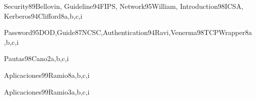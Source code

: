 \begin{syllabus}
\begin{unit}{\NCNetworkSecurityDef}{}{Security89Bellovin, Guideline94FIPS, Network95William, Introduction98ICSA, Kerberos94Clifford}{8}{a,b,c,i}
    \NCNetworkSecurityAllTopics
    \NCNetworkSecurityAllObjectives
\end{unit}

\begin{unit}{\NCNetworkManagementDef}{}{Password95DOD,Guide87NCSC,Authentication94Ravi,Venerma98TCPWrapper}{8}{a,b,c,i}
    \NCNetworkManagementAllTopics
    \NCNetworkManagementAllObjectives
\end{unit}

\begin{unit}{\HCHumanFactorsAndSecurityDef}{}{Pautas98Cano}{2}{a,b,c,i}
    \HCHumanFactorsAndSecurityAllTopics
    \HCHumanFactorsAndSecurityAllObjectives
\end{unit}

\begin{unit}{\SPSecurityOperationsDef}{}{Aplicaciones99Ramio}{8}{a,b,c,i}
    \SPSecurityOperationsAllTopics
    \SPSecurityOperationsAllObjectives
\end{unit}

\begin{unit}{\PLVirtualMachinesDef}{}{Aplicaciones99Ramio}{3}{a,b,c,i}
\begin{topics}
    \item \PLVirtualMachinesTopicSecurity
\end{topics}

\begin{learningoutcomes}
    \item \PLVirtualMachinesObjFOUR
\end{learningoutcomes}
\end{unit}

\begin{coursebibliography}
\end{coursebibliography}

\end{syllabus}
